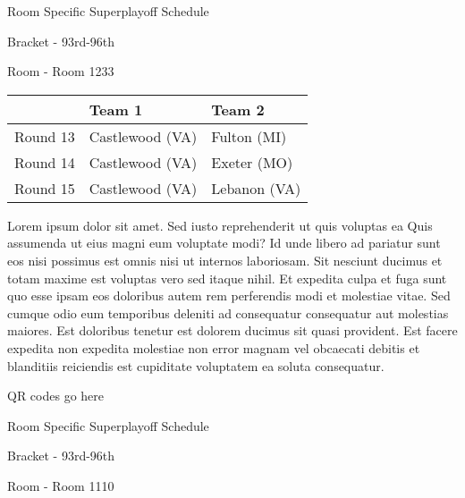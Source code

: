 \documentclass{article}%
\begin{document}
\newpage%
\begin{center}%
\begin{Huge}%
Room Specific Superplayoff Schedule%
\end{Huge}%
\vspace*{8pt}%
\linebreak%
\begin{Large}%
Bracket {-} 93rd{-}96th%
\end{Large}%
\vspace*{8pt}%
\linebreak%
\vspace*{8pt}%
\begin{Large}%
Room {-} Room 1233%
\end{Large}%
\end{center}%
%
\begin{tabularx}{\textwidth}{|c|Y|Y|}%
\hline%
&Team 1&Team 2\\%
\hline%
Round 13&Castlewood (VA)&Fulton (MI)\\%
Round 14&Castlewood (VA)&Exeter (MO)\\%
Round 15&Castlewood (VA)&Lebanon (VA)\\%
\hline%
\end{tabularx}%
\vspace*{8pt}%
\newline%
Lorem ipsum dolor sit amet. Sed iusto reprehenderit ut quis voluptas ea Quis assumenda ut eius magni eum voluptate modi? Id unde libero ad pariatur sunt eos nisi possimus est omnis nisi ut internos laboriosam. Sit nesciunt ducimus et totam maxime est voluptas vero sed itaque nihil. Et expedita culpa et fuga sunt quo esse ipsam eos doloribus autem rem perferendis modi et molestiae vitae.\newline%
\newline%
Sed cumque odio eum temporibus deleniti ad consequatur consequatur aut molestias maiores. Est doloribus tenetur est dolorem ducimus sit quasi provident. Est facere expedita non expedita molestiae non error magnam vel obcaecati debitis et blanditiis reiciendis est cupiditate voluptatem ea soluta consequatur.%
\vspace*{140pt}%
\begin{center}%
\begin{Huge}%
QR codes go here%
\end{Huge}%
\end{center}%
\newpage%
\begin{center}%
\begin{Huge}%
Room Specific Superplayoff Schedule%
\end{Huge}%
\vspace*{8pt}%
\linebreak%
\begin{Large}%
Bracket {-} 93rd{-}96th%
\end{Large}%
\vspace*{8pt}%
\linebreak%
\vspace*{8pt}%
\begin{Large}%
Room {-} Room 1110%
\end{Large}%
\end{center}%
\end{document}
